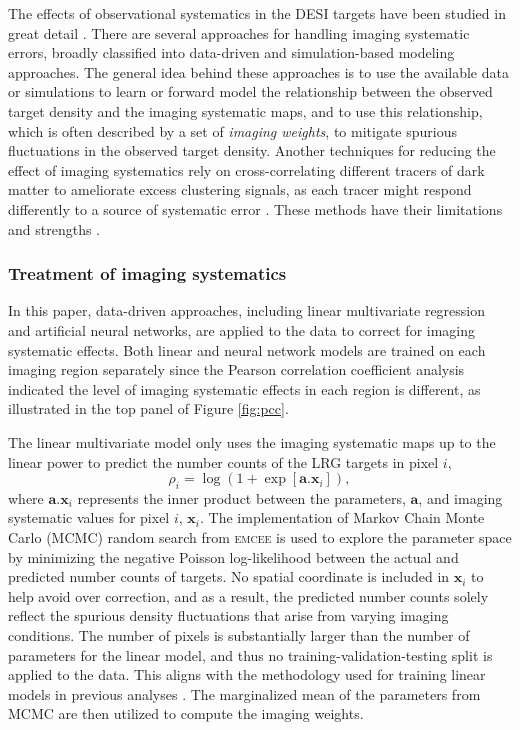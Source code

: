 The effects of observational systematics in the DESI targets have been studied in great detail \cite[see, e.g.,][]{kitanidis2020imaging, zhou2021clustering, chaussidon2022angular}. There are several approaches for handling imaging systematic errors, broadly classified into data-driven and simulation-based modeling approaches. The general idea behind these approaches is to use the available data or simulations to learn or forward model the relationship between the observed target density and the imaging systematic maps, and to use this relationship, which is often described by a set of \textit{imaging weights}, to mitigate spurious fluctuations in the observed target density. Another techniques for reducing the effect of imaging systematics rely on cross-correlating different tracers of dark matter to ameliorate excess clustering signals, as each tracer might respond differently to a source of systematic error \citep[see, e.g.,][]{giannantonio2014improved}. These methods have their limitations and strengths \citep[see, e.g.,][for a review]{2021MNRAS.503.5061W}.

\subsubsection{Treatment of imaging systematics}
In this paper, data-driven approaches, including linear multivariate regression and artificial neural networks, are applied to the data to correct for imaging systematic effects. Both linear and neural network models are trained on each imaging region separately since the Pearson correlation coefficient analysis indicated the level of imaging systematic effects in each region is different, as illustrated in the top panel of Figure \ref{fig:pcc}. 

The linear multivariate model only uses the imaging systematic maps up to the linear power to predict the number counts of the LRG targets in pixel $i$,
\begin{equation}\label{eq:npred}
    \rho_{i} = \log ( 1 + \exp[\textbf{a}.\textbf{x}_{i}]),
\end{equation}
where $\textbf{a}.\textbf{x}_{i}$ represents the inner product between the parameters, $\textbf{a}$, and imaging systematic values for pixel $i$, $\textbf{x}_{i}$. The implementation of Markov Chain Monte Carlo (MCMC) random search from \textsc{emcee} \citep{2013PASP..125..306F} is used to explore the parameter space by minimizing the negative Poisson log-likelihood between the actual and predicted number counts of targets. No spatial coordinate is included in $\textbf{x}_{i}$ to help avoid over correction, and as a result, the predicted number counts solely reflect the spurious density fluctuations that arise from varying imaging conditions. The number of pixels is substantially larger than the number of parameters for the linear model, and thus no training-validation-testing split is applied to the data. This aligns with the methodology used for training linear models in previous analyses \citep[see, e.g.,][]{zhou2022target}. The marginalized mean of the parameters from MCMC are then utilized to compute the imaging weights.


